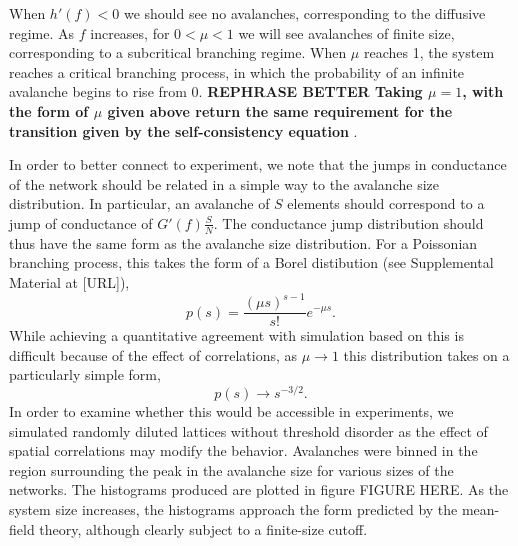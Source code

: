 \documentclass[aps,prl,reprint,groupedaddress]{revtex4-1}
\begin{document}
When $h'(f)<0$ we should see no avalanches, corresponding to the diffusive
regime.  As $f$ increases, for $0<\mu < 1$ we will see avalanches of finite
size, corresponding to a subcritical branching regime.  When $\mu$ reaches 1,
the system reaches a critical branching process, in which the probability of
an infinite avalanche begins to rise from 0. {\bf REPHRASE BETTER Taking $\mu=1$, with the form of
$\mu$ given above return the same requirement for the transition given by the
self-consistency equation }.

In order to better connect to
experiment, we note that the jumps in conductance of the network should be 
related in a simple way to the avalanche size distribution.  In particular,
an avalanche of $S$ elements should correspond to a jump of conductance of
$G'(f)\frac{S}{N}$.  The conductance jump distribution should thus have the
same form as the avalanche size distribution. For a Poissonian branching
process, this takes the form of a Borel distibution
(see Supplemental Material at [URL]),
\begin{equation}
p(s) = \frac{(\mu s)^{s-1}}{s!}e^{-\mu s}.
\end{equation}
While achieving a quantitative agreement with simulation based on this is
difficult because of the effect of correlations,
as $\mu\to 1$ this distribution takes on a particularly simple form,
\begin{equation}
p(s) \to s^{-3/2}.
\end{equation}
In order to examine whether this would be accessible in experiments, we
simulated randomly diluted lattices without threshold disorder as the
effect of spatial correlations may modify the behavior.  Avalanches were
binned in the region surrounding the peak in the avalanche size for
various sizes of the networks. The histograms produced are plotted in
figure FIGURE HERE. As the system size increases, the histograms approach
the form predicted by the mean-field theory, although clearly subject to a finite-size
cutoff.
\end{document}
